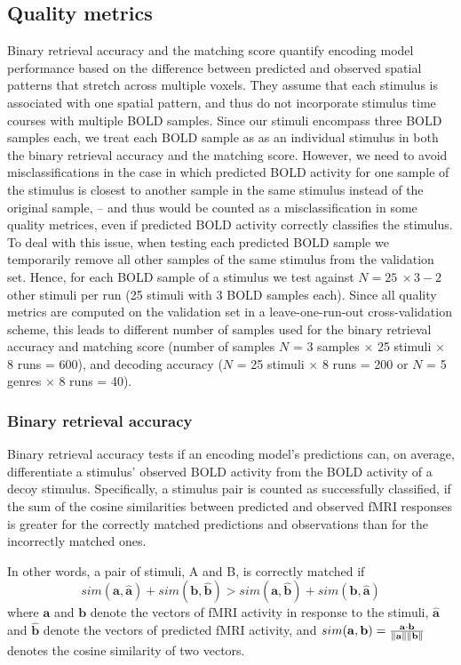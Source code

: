 \subsection*{Quality metrics} 

Binary retrieval accuracy and the matching score quantify encoding model performance based on the difference between predicted and observed spatial patterns that stretch across multiple voxels. They assume that each stimulus is associated with one spatial pattern, and thus do not incorporate stimulus time courses with multiple BOLD samples. Since our stimuli encompass three BOLD samples each, we treat each BOLD sample as as an individual stimulus in both the binary retrieval accuracy and the matching score. However, we need to avoid misclassifications in the case in which predicted BOLD activity for one sample of the stimulus is closest to another sample in the same stimulus instead of the original sample, -- and thus would be counted as a misclassification in some quality metrices, even if predicted BOLD activity correctly classifies the stimulus.
To deal with this issue, when testing each predicted BOLD sample we temporarily remove all other samples of the same stimulus from the validation set.
Hence, for each BOLD sample of a stimulus we test against $N = 25\:\times 3 - 2$ other stimuli per run (25 stimuli with 3 BOLD samples each).
Since all quality metrics are computed on the validation set in a leave-one-run-out cross-validation scheme, this leads to different number of samples used for the binary retrieval accuracy and matching score (number of samples $N$ = 3 samples $\times$ 25 stimuli $\times$ 8 runs = 600), and decoding accuracy ($N$ = 25 stimuli $\times$ 8 runs = 200 or $N$ = 5 genres $\times$ 8 runs = 40).

\subsubsection*{Binary retrieval accuracy}

Binary retrieval accuracy \citep{ML08} tests if an encoding model's predictions can, on average, differentiate a stimulus' observed BOLD activity from the BOLD activity of a decoy stimulus. Specifically, a stimulus pair is counted as successfully classified, if the sum of the cosine similarities between predicted and observed f{MRI} responses is greater for the correctly matched predictions and observations than for the incorrectly matched ones.

In other words, a pair of stimuli, A and B, is correctly matched if
$$sim(\mathbf{a},\mathbf{\hat{a}}) + sim(\mathbf{b},\mathbf{\hat{b}}) > sim(\mathbf{a}, \mathbf{\hat{b}}) + sim(\mathbf{b}, \mathbf{\hat{a}})$$
where $\mathbf{a}$ and $\mathbf{b}$ denote the vectors of fMRI activity in response to the stimuli, $\mathbf{\hat{a}}$ and $\mathbf{\hat{b}}$ denote the vectors of predicted fMRI activity, and $sim(\mathbf{a},\mathbf{b})=\frac{\mathbf{a}\cdot\mathbf{b}}{\left\lVert \mathbf{a} \right\rVert\left\lVert \mathbf{b} \right\rVert}$ denotes the cosine similarity of two vectors.

